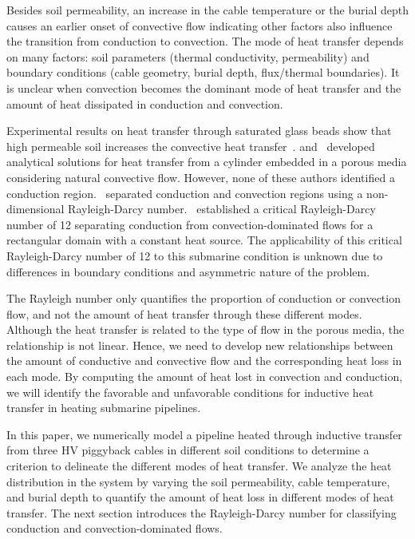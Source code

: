 \documentclass[Journal,letterpaper,InsideFigs]{ascelike-new}
\begin{document}
Besides soil permeability, an increase in the cable temperature or the burial depth causes an earlier onset of convective flow indicating other factors also influence the transition from conduction to convection. The mode of heat transfer depends on many factors: soil parameters (thermal conductivity, permeability) and boundary conditions (cable geometry, burial depth, flux/thermal boundaries). It is unclear when convection becomes the dominant mode of heat transfer and the amount of heat dissipated in conduction and convection. 

Experimental results on heat transfer through saturated glass beads show that high permeable soil increases the convective heat transfer~\cite{fand1986natural}.  and~ developed analytical solutions for heat transfer from a cylinder embedded in a porous media considering natural convective flow. However, none of these authors identified a conduction region.~  separated conduction and convection regions using a non-dimensional Rayleigh-Darcy number.~ established a critical Rayleigh-Darcy number of 12 separating conduction from convection-dominated flows for a rectangular domain with a constant heat source. The applicability of this critical Rayleigh-Darcy number of 12 to this submarine condition is unknown due to differences in boundary conditions and asymmetric nature of the problem. 

The Rayleigh number only quantifies the proportion of conduction or convection flow, and not the amount of heat transfer through these different modes. Although the heat transfer is related to the type of flow in the porous media, the relationship is not linear. Hence, we need to develop new relationships between the amount of conductive and convective flow and the corresponding heat loss in each mode. By computing the amount of heat lost in convection and conduction, we will identify the favorable and unfavorable conditions for inductive heat transfer in heating submarine pipelines.

In this paper, we numerically model a pipeline heated through inductive transfer from three HV piggyback cables in different soil conditions to determine a criterion to delineate the different modes of heat transfer. We analyze the heat distribution in the system by varying the soil permeability, cable temperature, and burial depth to quantify the amount of heat loss in different modes of heat transfer. The next section introduces the Rayleigh-Darcy number for classifying conduction and convection-dominated flows. 
\end{document}
